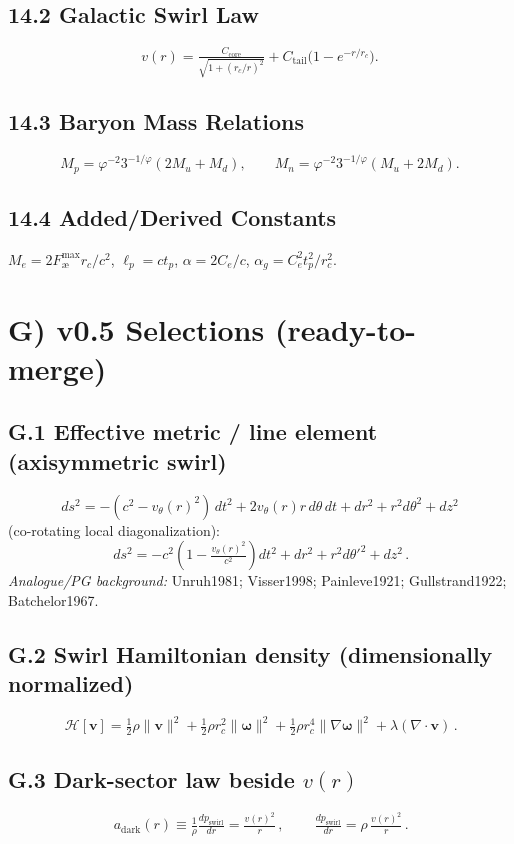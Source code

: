 \documentclass[11pt,a4paper]{article}
\begin{document}
    \subsection*{14.2 Galactic Swirl Law}
    \[
        \boxed{v(r) = \tfrac{C_{\text{core}}}{\sqrt{1 + (r_c/r)^2}} + C_{\text{tail}}\big(1 - e^{-r/r_c}\big)}.
    \]
    \subsection*{14.3 Baryon Mass Relations}
    \[
        \boxed{M_p = \varphi^{-2} 3^{-1/\varphi}(2 M_u + M_d)},\qquad
        \boxed{M_n = \varphi^{-2} 3^{-1/\varphi}(M_u + 2 M_d)}.
    \]
    \subsection*{14.4 Added/Derived Constants}
    $M_e=2 F_{\text{\ae}}^{\max} r_c/c^2$, $\ell_p=c t_p$, $\alpha=2C_e/c$, $\alpha_g=C_e^{2} t_p^{2}/r_c^{2}$.

    \section*{G) v0.5 Selections (ready-to-merge)}
    \subsection*{G.1 Effective metric / line element (axisymmetric swirl)}
    \[
        \boxed{\,ds^2 = -(c^2 - v_\theta(r)^2)\,dt^2 + 2 v_\theta(r) r\, d\theta\, dt + dr^2 + r^2 d\theta^2 + dz^2\,}
    \]
    (co-rotating local diagonalization):
    \[
        \boxed{\,ds^2 = -c^2\!\left(1 - \tfrac{v_\theta(r)^2}{c^2}\right)\!dt^2 + dr^2 + r^2 d\theta'^2 + dz^2\,}.
    \]
    \emph{Analogue/PG background:} Unruh1981; Visser1998; Painleve1921; Gullstrand1922; Batchelor1967.

    \subsection*{G.2 Swirl Hamiltonian density (dimensionally normalized)}
    \[
        \boxed{\,\mathcal{H}[\bm v] = \tfrac{1}{2}\rho \lVert \bm v \rVert^2 + \tfrac{1}{2}\rho r_c^2 \lVert \bm\omega \rVert^2 + \tfrac{1}{2}\rho r_c^4 \lVert \nabla \bm\omega \rVert^2 + \lambda (\nabla\!\cdot\! \bm v)\,}.
    \]

    \subsection*{G.3 Dark-sector law beside $v(r)$}
    \[
        \boxed{\,a_{\text{dark}}(r) \equiv \tfrac{1}{\rho}\tfrac{dp_{\text{swirl}}}{dr} = \tfrac{v(r)^2}{r}\,},\qquad
        \boxed{\,\tfrac{dp_{\text{swirl}}}{dr} = \rho\,\tfrac{v(r)^2}{r}\,}.
    \]
\end{document}
